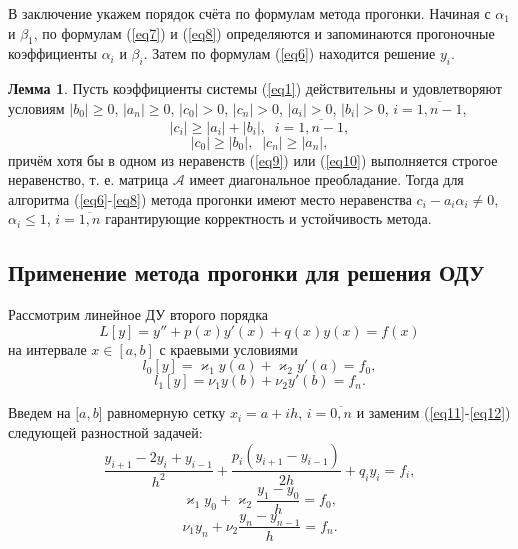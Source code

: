 \documentclass[
11pt,
master, %
subf, %
href, %
colorlinks=true, %
times, %
]{disser}
\begin{document}
В заключение укажем порядок счёта по формулам метода прогонки. Начиная с $\alpha_1$ и $\beta_1$, по формулам (\ref{eq7}) и (\ref{eq8}) определяются и запоминаются прогоночные коэффициенты $\alpha_i$ и $\beta_i$. Затем по формулам (\ref{eq6}) находится решение $y_i$.

\textbf{Лемма 1}. Пусть коэффициенты системы (\ref{eq1}) действительны и удовлетворяют условиям $|b_0| \geq 0$, $|a_n| \geq 0$, $|c_0| > 0$, $|c_n| > 0$, $|a_i| > 0$, $|b_i| > 0$, $i = \overline{1, n-1}$,
\begin{equation}\label{eq9}
    |c_i| \geq |a_i| + |b_i|, \;\; i = \overline{1, n-1},
\end{equation}
\begin{equation}\label{eq10}
    |c_0| \geq |b_0|, \;\; |c_n| \geq |a_n|,
\end{equation}
причём хотя бы в одном из неравенств (\ref{eq9}) или (\ref{eq10}) выполняется строгое неравенство, т. е. матрица $\mathcal{A}$ имеет диагональное преобладание. Тогда для алгоритма (\ref{eq6}-\ref{eq8}) метода прогонки имеют место неравенства $c_i - a_i \alpha_i \neq 0$, $\alpha_i \leq 1$, $i = \overline{1,n}$ гарантирующие корректность и устойчивость метода.

\subsection{Применение метода прогонки для решения ОДУ}
Рассмотрим линейное ДУ второго порядка
\begin{equation}\label{eq11}
    L[y] = y'' + p(x) y'(x) + q(x) y(x) = f(x)
\end{equation}
на интервале $x\in[a,b]$ с краевыми условиями
\begin{equation}\label{eq12}
    l_0[y] = \varkappa_1 y(a) + \varkappa_2 y'(a) = f_0,
\end{equation}
$$l_1[y] = \nu_1 y(b) + \nu_2 y'(b) = f_n.$$

Введем на $[a,b$] равномерную сетку $x_i = a + ih$, $i = \overline{0, n}$ и заменим (\ref{eq11}-\ref{eq12}) следующей разностной задачей:
\begin{equation}\label{eq13}
    \frac{y_{i+1} - 2y_i + y_{i-1}}{h^2} + \frac{p_i(y_{i+1} - y_{i-1})}{2h} + q_i y_i = f_i,
\end{equation}
\begin{equation}\label{eq14}
    \varkappa_1 y_0 + \varkappa_2 \frac{y_1 - y_0}{h} = f_0,
\end{equation}
$$\nu_1 y_n + \nu_2 \frac{y_n - y_{n-1}}{h} = f_n.$$
\end{document}
